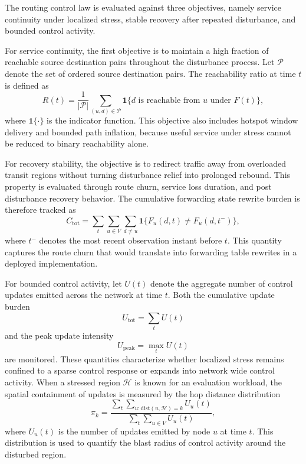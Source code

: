 \documentclass[5p,times]{elsarticle}
\begin{document}
The routing control law is evaluated against three objectives, namely service continuity under localized stress, stable recovery after repeated disturbance, and bounded control activity.

For service continuity, the first objective is to maintain a high fraction of reachable source destination pairs throughout the disturbance process. Let $\mathcal{P}$ denote the set of ordered source destination pairs. The reachability ratio at time $t$ is defined as
\begin{equation}
R(t) = \frac{1}{|\mathcal{P}|}\sum_{(u,d)\in\mathcal{P}} \mathbf{1}\{\text{$d$ is reachable from $u$ under }F(t)\},
\end{equation}
where $\mathbf{1}\{\cdot\}$ is the indicator function. This objective also includes hotspot window delivery and bounded path inflation, because useful service under stress cannot be reduced to binary reachability alone.

For recovery stability, the objective is to redirect traffic away from overloaded transit regions without turning disturbance relief into prolonged rebound. This property is evaluated through route churn, service loss duration, and post disturbance recovery behavior.
The cumulative forwarding state rewrite burden is therefore tracked as
\begin{equation}
C_{\mathrm{tot}} = \sum_t \sum_{u\in V}\sum_{d\neq u}
\mathbf{1}\{F_u(d,t)\neq F_u(d,t^-)\},
\end{equation}
where $t^-$ denotes the most recent observation instant before $t$. This quantity captures the route churn that would translate into forwarding table rewrites in a deployed implementation.

For bounded control activity, let $U(t)$ denote the aggregate number of control updates emitted across the network at time $t$. Both the cumulative update burden
\begin{equation}
U_{\mathrm{tot}} = \sum_t U(t)
\end{equation}
and the peak update intensity
\begin{equation}
U_{\mathrm{peak}} = \max_t U(t)
\end{equation}
are monitored. These quantities characterize whether localized stress remains confined to a sparse control response or expands into network wide control activity.
When a stressed region $\mathcal{H}$ is known for an evaluation workload, the spatial containment of updates is measured by the hop distance distribution
\begin{equation}
\pi_k = \frac{\sum_t \sum_{u:\mathrm{dist}(u,\mathcal{H})=k} U_u(t)}
{\sum_t \sum_{u\in V} U_u(t)},
\end{equation}
where $U_u(t)$ is the number of updates emitted by node $u$ at time $t$. This distribution is used to quantify the blast radius of control activity around the disturbed region.
\end{document}

